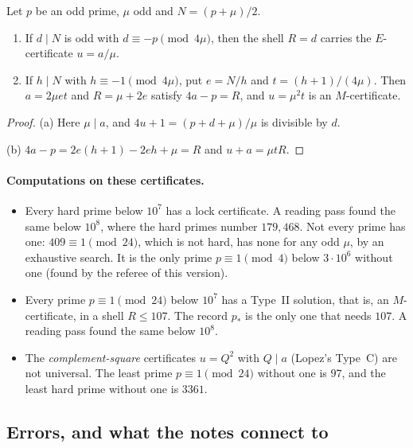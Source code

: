 \begin{proposition}\label{prop:locks}
Let $p$ be an odd prime, $\mu$ odd and $N=(p+\mu)/2$.
\begin{enumerate}[label=(\alph*)]
\item If $d\mid N$ is odd with $d\equiv-p\pmod{4\mu}$, then the shell $R=d$ carries the $E$-certificate $u=a/\mu$.
\item If $h\mid N$ with $h\equiv-1\pmod{4\mu}$, put $e=N/h$ and $t=(h+1)/(4\mu)$. Then $a=2\mu et$ and $R=\mu+2e$ satisfy $4a-p=R$, and $u=\mu^2t$ is an $M$-certificate.
\end{enumerate}
\end{proposition}
\begin{proof}
(a) Here $\mu\mid a$, and $4u+1=(p+d+\mu)/\mu$ is divisible by $d$.

(b) $4a-p=2e(h+1)-2eh+\mu=R$ and $u+a=\mu tR$.
\end{proof}

\paragraph{Computations on these certificates.}
\begin{itemize}
\item Every hard prime below $10^7$ has a lock certificate. A reading pass found the same below $10^8$, where the hard primes number $179{,}468$. Not every prime has one: $409\equiv1\pmod{24}$, which is not hard, has none for any odd $\mu$, by an exhaustive search. It is the only prime $p\equiv1\pmod4$ below $3\cdot10^6$ without one (found by the referee of this version).
\item Every prime $p\equiv1\pmod{24}$ below $10^7$ has a Type~II solution, that is, an $M$-certificate, in a shell $R\le107$. The record $p_*$ is the only one that needs $107$. A reading pass found the same below $10^8$.
\item The \emph{complement-square} certificates $u=Q^2$ with $Q\mid a$ (Lopez's Type~C) are not universal. The least prime $p\equiv1\pmod{24}$ without one is $97$, and the least hard prime without one is $3361$.
\end{itemize}

\subsection{Errors, and what the notes connect to}\label{ssec:noteserrors}

